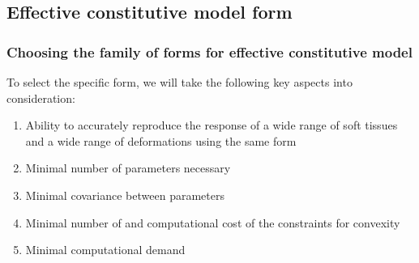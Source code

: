 \subsection{Effective constitutive model form}
\subsubsection{Choosing the family of forms for effective constitutive model}

	To select the specific form, we will take the following key aspects into consideration:
\begin{enumerate}
\item Ability to accurately reproduce the response of a wide range of soft tissues and a wide range of deformations using the same form
\item Minimal number of parameters necessary
\item Minimal covariance between parameters
\item Minimal number of and computational cost of the constraints for convexity
\item Minimal computational demand
\end{enumerate}

